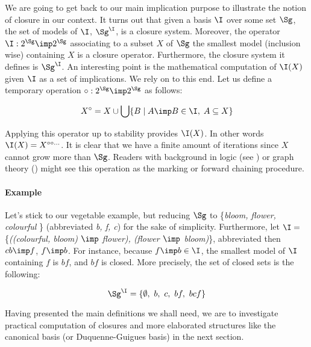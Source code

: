 \vspace{1.2em}

We are going to get back to our main implication purpose to illustrate the 
notion of closure in our context. It turns out that given a basis
$\I$ over some set $\Sg$, the set of models of $\I$, $\Sg^{\I}$, is a closure 
system. Moreover, the operator $\I : 2^{\Sg} \imp 2^{\Sg}$ associating to a 
subset $X$ of $\Sg$ the smallest model (inclusion wise) containing $X$ is 
a closure operator. Furthermore, the closure system it defines is 
$\Sg^{\I}$. An interesting point is the mathematical computation of 
$\I(X)$ given $\I$ as a set of implications. We rely on 
\cite{wild_implicational_1989, b._ganter_conceptual_2016} to this end. Let 
us define a temporary operation $\circ : 2^{\Sg} \imp 2^{\Sg}$ as follows:

\[ X^{\circ} = 
X \cup \bigcup \{ B \; | \; A \imp B \in \I, \; A \subseteq X \} \]

\noindent Applying this operator up to stability provides $\I(X)$. In other 
words $\I(X) 
= X^{\circ \circ \dots}$. It is clear that we have a finite amount of 
iterations since $X$ cannot grow more than $\Sg$. Readers with background in
logic (see \cite{boros_strong_2017}) or graph theory 
(\cite{berczi_directed_2017}) might see this operation as the marking or 
forward chaining procedure.

\vspace{1.2em}

\paragraph{Example} Let's stick to our vegetable example, but reducing $\Sg$ to 
\{\textit{bloom, flower, colourful} \} (abbreviated \textit{b, f, c}) for the 
sake of simplicity. Furthermore, let $\I =$ \{\textit{((colourful, bloom) 
$\imp$ flower), (flower $\imp$ bloom)}\}, abbreviated then $cb \imp f$, $f 
\imp b$. For instance, because $f \imp b \in \I$, the smallest model of $\I$ 
containing $f$ is $bf$, and $bf$ is closed. More precisely, the set of closed
sets is the following:

	\[ \Sg^{\I} = \{ \emptyset, \ b, \ c, \ bf, \ bcf \} \]
	
\vspace{1.2em}

Having presented the main definitions we shall need, we are to investigate 
practical computation of closures and more elaborated structures like the 
canonical basis (or Duquenne-Guigues basis) in the next section.



